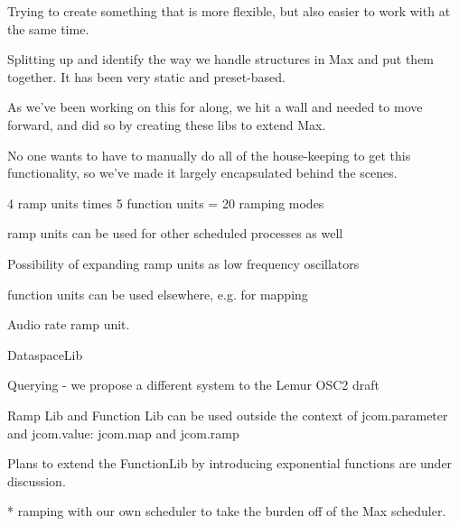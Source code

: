 \documentclass{article}
\begin{document}
Trying to create something that is more flexible, but also easier to work with at the same time.

Splitting up and identify the way we handle structures in Max and put them together.  It has been very static and preset-based.

As we've been working on this for along, we hit a wall and needed to move forward, and did so by creating these libs to extend Max.  

No one wants to have to manually do all of the house-keeping to get this functionality, so we've made it largely encapsulated behind the scenes.


\cite{Momeni:2003}



4 ramp units times 5 function units = 20 ramping modes

ramp units can be used for other scheduled processes as well

Possibility of expanding ramp units as low frequency oscillators

function units can be used elsewhere, e.g. for mapping

Audio rate ramp unit.

DataspaceLib

Querying - we propose a different system to the Lemur OSC2 draft

Ramp Lib and Function Lib can be used outside the context of jcom.parameter and jcom.value: jcom.map and jcom.ramp


Plans to extend the FunctionLib by introducing exponential functions are under discussion. %


* ramping with our own scheduler to take the burden off of the Max scheduler.





%
%
%

%

%
\end{document}
